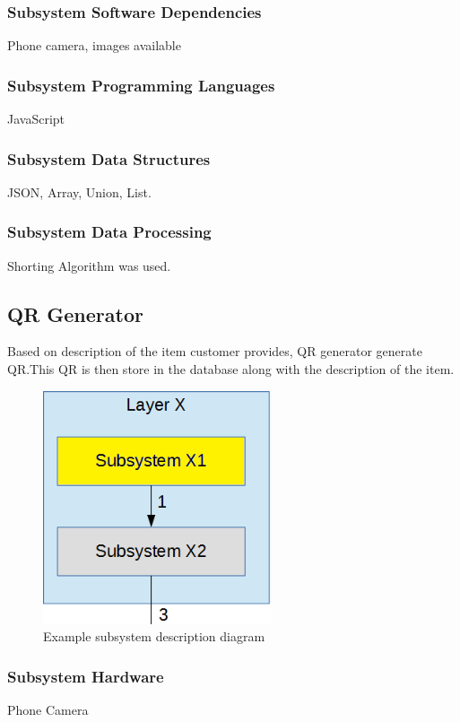\subsubsection{Subsystem Software Dependencies}
Phone camera, images available

\subsubsection{Subsystem Programming Languages}
JavaScript

\subsubsection{Subsystem Data Structures}
JSON, Array, Union, List.

\subsubsection{Subsystem Data Processing}
Shorting Algorithm was used.


\subsection{QR Generator}
Based on description of the item customer provides, QR generator generate QR.This QR is then store in the database along with the  description of the item.

\begin{figure}[h!]
	\centering
 	\includegraphics[width=0.60\textwidth]{images/subsystem}
 \caption{Example subsystem description diagram}
\end{figure}

\subsubsection{Subsystem Hardware}
Phone Camera

